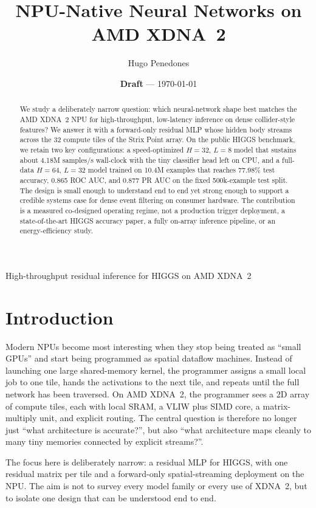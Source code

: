 \documentclass[a4paper,11pt]{article}
\title{NPU-Native Neural Networks on AMD XDNA~2}
\author{Hugo Penedones}
\date{\textbf{Draft} --- \today}
\begin{document}
\maketitle

\begin{center}
\large\color{black!70} High-throughput residual inference for HIGGS on AMD XDNA~2
\end{center}

\begin{abstract}
We study a deliberately narrow question: which neural-network shape best
matches the AMD XDNA~2 NPU for high-throughput, low-latency inference on dense
collider-style features? We answer it with a forward-only residual MLP whose
hidden body streams across the 32 compute tiles of the Strix Point array. On
the public HIGGS benchmark, we retain two key configurations: a speed-optimized
$H=32$, $L=8$ model that sustains about 4.18M samples/s wall-clock with the
tiny classifier head left on CPU, and a full-data $H=64$, $L=32$ model trained
on 10.4M examples that reaches 77.98\% test accuracy, 0.865 ROC AUC, and 0.877
PR AUC on the fixed 500k-example test split. The design is small enough to
understand end to end yet strong enough to support a credible systems case for
dense event filtering on consumer hardware. The contribution is a measured
co-designed operating regime, not a production trigger deployment, a
state-of-the-art HIGGS accuracy paper, a fully on-array inference pipeline, or
an energy-efficiency study.
\end{abstract}

\section{Introduction}

Modern NPUs become most interesting when they stop being treated as ``small
GPUs'' and start being programmed as spatial dataflow machines. Instead of
launching one large shared-memory kernel, the programmer assigns a small local
job to one tile, hands the activations to the next tile, and repeats until the
full network has been traversed. On AMD XDNA~2, the programmer sees a 2D array
of compute tiles, each with local SRAM, a VLIW plus SIMD core, a
matrix-multiply unit, and explicit routing. The central question is therefore
no longer just ``what architecture is accurate?'', but also ``what architecture
maps cleanly to many tiny memories connected by explicit streams?''.

The focus here is deliberately narrow: a residual MLP for HIGGS, with one
residual matrix per tile and a forward-only spatial-streaming deployment on the
NPU. The aim is not to survey every model family or every use of XDNA~2, but
to isolate one design that can be understood end to end.
\end{document}
